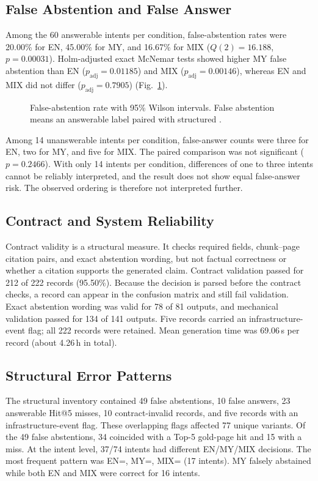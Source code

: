 \documentclass[a4paper,conference]{IEEEtran}
\newcommand{\code}[1]{\texttt{\detokenize{#1}}}
\begin{document}
\subsection{False Abstention and False Answer}
Among the 60 answerable intents per condition, false-abstention rates were 20.00\% for EN, 45.00\% for MY, and 16.67\% for MIX ($Q(2)=16.188$, $p=0.00031$). Holm-adjusted exact McNemar tests showed higher MY false abstention than EN ($p_{\mathrm{adj}}=0.01185$) and MIX ($p_{\mathrm{adj}}=0.00146$), whereas EN and MIX did not differ ($p_{\mathrm{adj}}=0.7905$) (Fig.~\ref{fig:false-abstention}).

\begin{figure}[t]
\centering

\caption{False-abstention rate with 95\% Wilson intervals. False abstention means an answerable label paired with structured \code{ABSTAIN}.}
\label{fig:false-abstention}
\end{figure}

Among 14 unanswerable intents per condition, false-answer counts were three for EN, two for MY, and five for MIX. The paired comparison was not significant ($p=0.2466$). With only 14 intents per condition, differences of one to three intents cannot be reliably interpreted, and the result does not show equal false-answer risk. The observed ordering is therefore not interpreted further.

\subsection{Contract and System Reliability}
Contract validity is a structural measure. It checks required fields, chunk--page citation pairs, and exact abstention wording, but not factual correctness or whether a citation supports the generated claim. Contract validation passed for 212 of 222 records (95.50\%). Because the decision is parsed before the contract checks, a record can appear in the confusion matrix and still fail validation. Exact abstention wording was valid for 78 of 81 \code{ABSTAIN} outputs, and mechanical validation passed for 134 of 141 \code{ANSWER} outputs. Five records carried an infrastructure-event flag; all 222 records were retained. Mean generation time was 69.06\,s per record (about 4.26\,h in total).

\subsection{Structural Error Patterns}
The structural inventory contained 49 false abstentions, 10 false answers, 23 answerable Hit@5 misses, 10 contract-invalid records, and five records with an infrastructure-event flag. These overlapping flags affected 77 unique variants. Of the 49 false abstentions, 34 coincided with a Top-5 gold-page hit and 15 with a miss. At the intent level, 37/74 intents had different EN/MY/MIX decisions. The most frequent pattern was EN=\code{ANSWER}, MY=\code{ABSTAIN}, MIX=\code{ANSWER} (17 intents). MY falsely abstained while both EN and MIX were correct for 16 intents.
\end{document}
